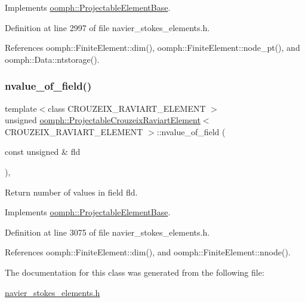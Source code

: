 Implements \hyperlink{classoomph_1_1ProjectableElementBase_ac6790f394630b964663281f8740f43a5}{oomph\+::\+Projectable\+Element\+Base}.



Definition at line 2997 of file navier\+\_\+stokes\+\_\+elements.\+h.



References oomph\+::\+Finite\+Element\+::dim(), oomph\+::\+Finite\+Element\+::node\+\_\+pt(), and oomph\+::\+Data\+::ntstorage().

\mbox{\label{classoomph_1_1ProjectableCrouzeixRaviartElement_adee290d9544673529406381ccdfbe818}} 
\subsubsection{\texorpdfstring{nvalue\+\_\+of\+\_\+field()}{nvalue\_of\_field()}}
{\footnotesize\ttfamily template$<$class C\+R\+O\+U\+Z\+E\+I\+X\+\_\+\+R\+A\+V\+I\+A\+R\+T\+\_\+\+E\+L\+E\+M\+E\+NT $>$ \\
unsigned \hyperlink{classoomph_1_1ProjectableCrouzeixRaviartElement}{oomph\+::\+Projectable\+Crouzeix\+Raviart\+Element}$<$ C\+R\+O\+U\+Z\+E\+I\+X\+\_\+\+R\+A\+V\+I\+A\+R\+T\+\_\+\+E\+L\+E\+M\+E\+NT $>$\+::nvalue\+\_\+of\+\_\+field (\begin{DoxyParamCaption}\item[{const unsigned \&}]{fld }\end{DoxyParamCaption})\hspace{0.3cm}{\ttfamily [inline]}, {\ttfamily [virtual]}}



Return number of values in field fld. 



Implements \hyperlink{classoomph_1_1ProjectableElementBase_a1a9a6de16f3511bca8e8be770abb9c2e}{oomph\+::\+Projectable\+Element\+Base}.



Definition at line 3075 of file navier\+\_\+stokes\+\_\+elements.\+h.



References oomph\+::\+Finite\+Element\+::dim(), and oomph\+::\+Finite\+Element\+::nnode().



The documentation for this class was generated from the following file\+:\begin{DoxyCompactItemize}
\item 
\hyperlink{navier__stokes__elements_8h}{navier\+\_\+stokes\+\_\+elements.\+h}\end{DoxyCompactItemize}

